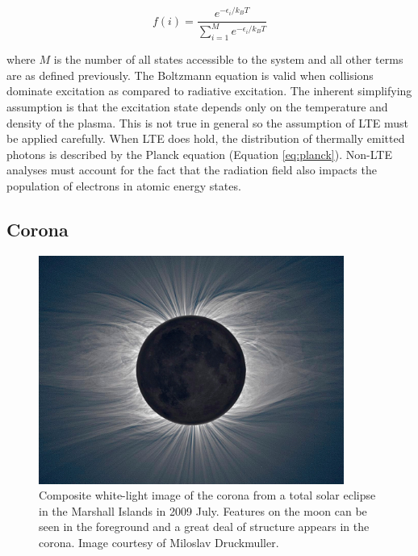 \begin{equation}
    \label{eq:boltzmann}
    f(i) = \frac{e^{-\epsilon_i / k_BT}}{\sum_{i=1}^M e^{-\epsilon_i / k_BT} }
\end{equation}

\noindent where $M$ is the number of all states accessible to the system and all other terms are as defined previously. The Boltzmann equation is valid when collisions dominate excitation as compared to radiative excitation. The inherent simplifying assumption is that the excitation state depends only on the temperature and density of the plasma. This is not true in general so the assumption of LTE must be applied carefully. When LTE does hold, the distribution of thermally emitted photons is described by the Planck equation (Equation \ref{eq:planck}). Non-LTE analyses must account for the fact that the radiation field also impacts the population of electrons in atomic energy states. 

\subsection{Corona}

\begin{figure}[!h]
    \begin{center}
	    \includegraphics[width=100mm]{Images/CoronaWhiteLight.png}
    \end{center}
    \caption[Corona in White Light]{
        Composite white-light image of the corona from a total solar eclipse in the Marshall Islands in 2009 July. 
        Features on the moon can be seen in the foreground and a great deal of structure appears in the corona. 
        Image courtesy of Miloslav Druckmuller. 
    }
    \label{fig:coronawhitelight}
\end{figure}

